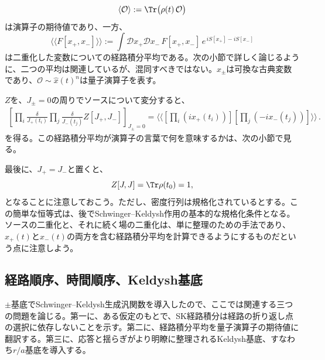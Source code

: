 \documentclass[a4paper,11pt,oneside]{article}
\theoremstyle{definition}
\numberwithin{equation}{section}
\newcommand{\expi}[1]{\langle \! \langle #1 \rangle \! \rangle}
\renewcommand{\O}{\mathcal{O}}
\begin{document}
\begin{equation}
\langle \O\rangle := \Tr \bigl(\rho(t)\,\O\bigr)
\end{equation}
は演算子の期待値であり、一方、
\begin{equation}
\langle\!\langle F[x_+,x_-]\rangle\!\rangle
:=
\int \mathcal D x_+ \mathcal D x_- \,
F[x_+,x_-]\,
e^{\,iS[x_+]-iS[x_-]}
\end{equation}
は二重化した変数についての経路積分平均である。次の小節で詳しく論じるように、二つの平均は関連しているが、混同すべきではない。$x_\pm$は可換な古典変数であり、$\O\sim \hat x(t)^{n}$は量子演算子を表す。



$ Z$を、$ J_{\pm}=0$の周りでソースについて変分すると、
\begin{align}
\left[ \prod_{i} \frac{\delta}{J_{+}(t_{i})}\prod_{j} \frac{\delta}{J_{-}(t_{j})}Z[J_{+},J_{-}] \right]_{J_{\pm}=0}=\expi{\left[ \prod_{i} (ix_{+}(t_{i})) \right] \left[ \prod_{j} (-ix_{-}(t_{j})) \right]}\,.
\end{align}
を得る。この経路積分平均が演算子の言葉で何を意味するかは、次の小節で見る。



最後に、$J_+=J_-$と置くと、
\begin{equation}
Z[J,J]=\Tr \rho(t_0) = 1 ,
\end{equation}
となることに注意しておこう。ただし、密度行列は規格化されているとする。この簡単な恒等式は、後でSchwinger--Keldysh作用の基本的な規格化条件となる。ソースの二重化と、それに続く場の二重化は、単に整理のための手法であり、$  x_{+}(t)$と$ x_{-}(t)$の両方を含む経路積分平均を計算できるようにするものだという点に注意しよう。







\subsection{経路順序、時間順序、Keldysh基底}



$\pm$基底でSchwinger--Keldysh生成汎関数を導入したので、ここでは関連する三つの問題を論じる。第一に、ある仮定のもとで、SK経路積分は経路の折り返し点の選択に依存しないことを示す。第二に、経路積分平均を量子演算子の期待値に翻訳する。第三に、応答と揺らぎがより明瞭に整理されるKeldysh基底、すなわち$r/a$基底を導入する。
\end{document}
